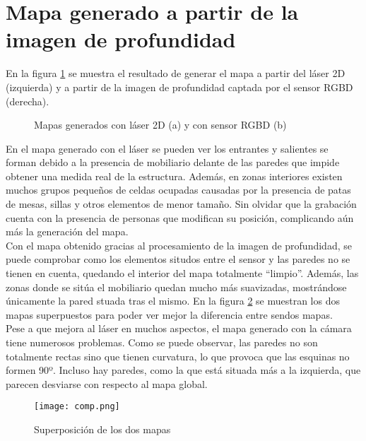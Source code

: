 \section{Mapa generado a partir de la imagen de profundidad}

En la figura \ref{fig:res_mapas} se muestra el resultado de generar el mapa a partir del láser 2D (izquierda) y a partir de la imagen de profundidad captada por el sensor RGBD (derecha).\\

\begin{figure}[h]
 \centering
 \caption{Mapas generados con láser 2D (a) y con sensor RGBD (b)}
 \label{fig:res_mapas}
\end{figure}

En el mapa generado con el láser se pueden ver los entrantes y salientes se forman debido a la presencia de mobiliario delante de las paredes que impide obtener una medida real de la estructura. Además, en zonas interiores existen muchos grupos pequeños de celdas ocupadas causadas por la presencia de patas de mesas, sillas y otros elementos de menor tamaño. Sin olvidar que la grabación cuenta con la presencia de personas que modifican su posición, complicando aún más la generación del mapa.\\

Con el mapa obtenido gracias al procesamiento de la imagen de profundidad, se puede comprobar como los elementos situdos entre el sensor y las paredes no se tienen en cuenta, quedando el interior del mapa totalmente ``limpio''. Además, las zonas donde se sitúa el mobiliario quedan mucho más suavizadas, mostrándose únicamente la pared stuada tras el mismo. En la figura \ref{fig:comp} se muestran los dos mapas superpuestos para poder ver mejor la diferencia entre sendos mapas.\\

Pese a que mejora al láser en muchos aspectos, el mapa generado con la cámara tiene numerosos problemas. Como se puede observar, las paredes no son totalmente rectas sino que tienen curvatura, lo que provoca que las esquinas no formen 90º. Incluso hay paredes, como la que está situada más a la izquierda, que parecen desviarse con respecto al mapa global.\\

\begin{figure}[h]
	\begin{center} 
		\texttt{[image: comp.png]}
	\end{center}
	\caption{Superposición de los dos mapas}
	\label{fig:comp}
\end{figure}

